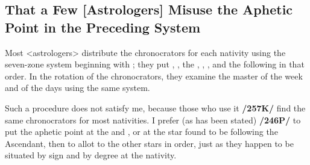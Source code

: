 \subsection{That a Few [Astrologers] Misuse the Aphetic Point in the Preceding System}

Most <astrologers> distribute the chronocrators for each nativity using the seven-zone system beginning with \Saturn; they put \Jupiter, \Mars, the \Sun, \Venus, \Mercury, and the \Moon\xspace following in that order. In the rotation of the chronocrators, they examine the master of the week and of the days using the same system. 

Such a procedure does not satisfy me, because those who use it \textbf{/257K/} find the same chronocrators for most nativities. I prefer (as has been stated) \textbf{/246P/} to put the aphetic point at the \Sun\xspace and \Moon, or at the star found to be following the Ascendant, then to allot to the other stars in order, just as they happen to be situated by sign and by degree at the nativity.

\newpage